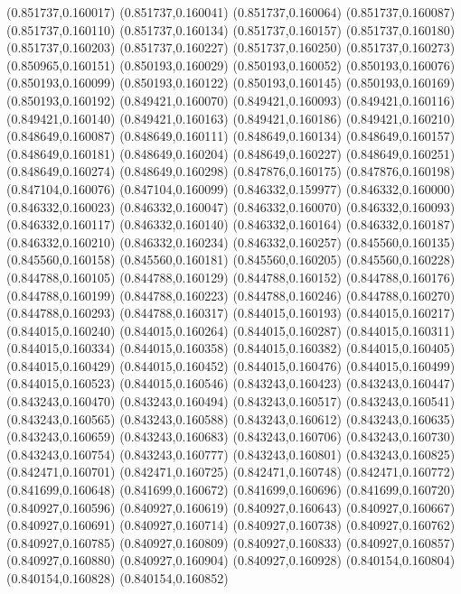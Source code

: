 (0.851737,0.160017)
(0.851737,0.160041)
(0.851737,0.160064)
(0.851737,0.160087)
(0.851737,0.160110)
(0.851737,0.160134)
(0.851737,0.160157)
(0.851737,0.160180)
(0.851737,0.160203)
(0.851737,0.160227)
(0.851737,0.160250)
(0.851737,0.160273)
(0.850965,0.160151)
(0.850193,0.160029)
(0.850193,0.160052)
(0.850193,0.160076)
(0.850193,0.160099)
(0.850193,0.160122)
(0.850193,0.160145)
(0.850193,0.160169)
(0.850193,0.160192)
(0.849421,0.160070)
(0.849421,0.160093)
(0.849421,0.160116)
(0.849421,0.160140)
(0.849421,0.160163)
(0.849421,0.160186)
(0.849421,0.160210)
(0.848649,0.160087)
(0.848649,0.160111)
(0.848649,0.160134)
(0.848649,0.160157)
(0.848649,0.160181)
(0.848649,0.160204)
(0.848649,0.160227)
(0.848649,0.160251)
(0.848649,0.160274)
(0.848649,0.160298)
(0.847876,0.160175)
(0.847876,0.160198)
(0.847104,0.160076)
(0.847104,0.160099)
(0.846332,0.159977)
(0.846332,0.160000)
(0.846332,0.160023)
(0.846332,0.160047)
(0.846332,0.160070)
(0.846332,0.160093)
(0.846332,0.160117)
(0.846332,0.160140)
(0.846332,0.160164)
(0.846332,0.160187)
(0.846332,0.160210)
(0.846332,0.160234)
(0.846332,0.160257)
(0.845560,0.160135)
(0.845560,0.160158)
(0.845560,0.160181)
(0.845560,0.160205)
(0.845560,0.160228)
(0.844788,0.160105)
(0.844788,0.160129)
(0.844788,0.160152)
(0.844788,0.160176)
(0.844788,0.160199)
(0.844788,0.160223)
(0.844788,0.160246)
(0.844788,0.160270)
(0.844788,0.160293)
(0.844788,0.160317)
(0.844015,0.160193)
(0.844015,0.160217)
(0.844015,0.160240)
(0.844015,0.160264)
(0.844015,0.160287)
(0.844015,0.160311)
(0.844015,0.160334)
(0.844015,0.160358)
(0.844015,0.160382)
(0.844015,0.160405)
(0.844015,0.160429)
(0.844015,0.160452)
(0.844015,0.160476)
(0.844015,0.160499)
(0.844015,0.160523)
(0.844015,0.160546)
(0.843243,0.160423)
(0.843243,0.160447)
(0.843243,0.160470)
(0.843243,0.160494)
(0.843243,0.160517)
(0.843243,0.160541)
(0.843243,0.160565)
(0.843243,0.160588)
(0.843243,0.160612)
(0.843243,0.160635)
(0.843243,0.160659)
(0.843243,0.160683)
(0.843243,0.160706)
(0.843243,0.160730)
(0.843243,0.160754)
(0.843243,0.160777)
(0.843243,0.160801)
(0.843243,0.160825)
(0.842471,0.160701)
(0.842471,0.160725)
(0.842471,0.160748)
(0.842471,0.160772)
(0.841699,0.160648)
(0.841699,0.160672)
(0.841699,0.160696)
(0.841699,0.160720)
(0.840927,0.160596)
(0.840927,0.160619)
(0.840927,0.160643)
(0.840927,0.160667)
(0.840927,0.160691)
(0.840927,0.160714)
(0.840927,0.160738)
(0.840927,0.160762)
(0.840927,0.160785)
(0.840927,0.160809)
(0.840927,0.160833)
(0.840927,0.160857)
(0.840927,0.160880)
(0.840927,0.160904)
(0.840927,0.160928)
(0.840154,0.160804)
(0.840154,0.160828)
(0.840154,0.160852)
